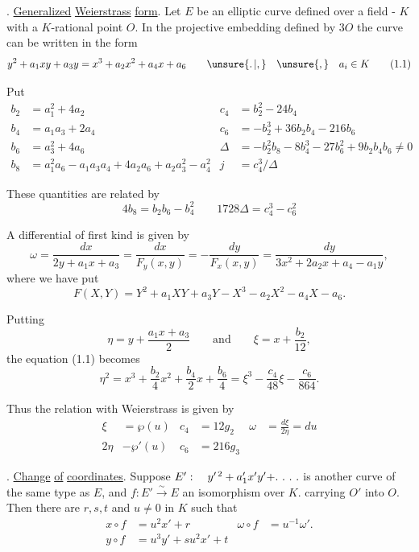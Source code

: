 
\begingroup
\makeatletter\tagsleft@true{}. \uline{Generalized} \uline{Weierstrass} \uline{form}. Let $E$ be an elliptic curve defined over a field - $K$ with a $K$-rational point $O$. In the projective embedding defined by $3O$ the curve can be written in the form
\[
y^2+a_1xy+a_3y=x^3+a_2x^2+a_4x+a_6
\qquad \unsure{\ldotp|,}\quad\unsure{,}\quad a_i\in K
\tag*{(1.1)}
\]

Put
\[
\begin{aligned}
 b_2&=a_1^2+4a_2                  & c_4&=b_2^2-24b_4\\
 b_4&=a_1a_3+2a_4                  & c_6&=-b_2^3+36b_2b_4-216b_6\\
 b_6&=a_3^2+4a_6                    & \Delta&=-b_2^2b_8-8b_4^3-27b_6^2+9b_2b_4b_6\ne0\\
 b_8&=a_1^2a_6-a_1a_3a_4+4a_2a_6+a_2a_3^2-a_4^2
                                      & j&=c_4^3/\Delta
\end{aligned}
\tag*{(1.2)}
\]

These quantities are related by
\[
4b_8=b_2b_6-b_4^2 \qquad 1728\Delta=c_4^3-c_6^2
\tag*{(1.3)}
\]

A differential of first kind is given by
\[
\omega=\frac{dx}{2y+a_1x+a_3}
=\frac{dx}{F_y(x,y)}=-\frac{dy}{F_x(x,y)}
=\frac{dy}{3x^2+2a_2x+a_4-a_1y},
\tag*{(1.4)}
\]
where we have put
\[
F(X,Y)=Y^2+a_1XY+a_3Y-X^3-a_2X^2-a_4X-a_6.
\tag*{(1.5)}
\]

Putting
\[
\eta=y+\frac{a_1x+a_3}{2}\qquad\text{and}\qquad
\xi=x+\frac{b_2}{12},
\tag*{(1.6)}
\]
the equation (1.1) becomes
\[
\eta^2=x^3+\frac{b_2}{4}x^2+\frac{b_4}{2}x+\frac{b_6}{4}
=\xi^3-\frac{c_4}{48}\xi-\frac{c_6}{864}.
\tag*{(1.7)}
\]

Thus the relation with Weierstrass is given by
\[
\begin{aligned}
\xi&=\wp(u) & c_4&=12g_2 &
\omega&=\frac{d\xi}{2\eta}=du\\
2\eta&-\wp'(u) & c_6&=216g_3
\end{aligned}
\tag*{(1.8)}
\]
\endgroup


\begingroup
\makeatletter\tagsleft@true{}. \uline{Change} \uline{of} \uline{coordinates}. Suppose $E':\quad y^{\prime\,2}+a_1'x'y'+\ldotp\,\ldotp\,\ldotp\,\ldotp$ is another curve of the same type as $E$, and $f:E'\overset{\sim}{\longrightarrow}E$ an isomorphism over $K$. carrying $O'$ into $O$. Then there are $r,s,t$ and $u\ne0$ in $K$ such that
\[
\begin{aligned}
x\circ f&=u^2x'+r & \omega\circ f&=u^{-1}\omega'.\\
y\circ f&=u^3y'+su^2x'+t
\end{aligned}
\tag*{(2.1)}
\]

